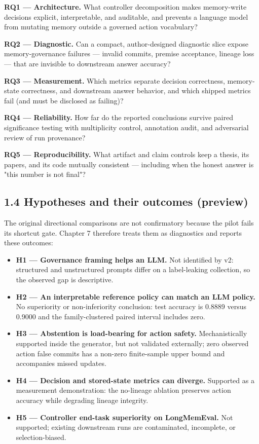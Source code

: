 \textbf{RQ1 --- Architecture.} What controller decomposition makes
memory-write decisions explicit, interpretable, and auditable, and
prevents a language model from mutating memory outside a governed action
vocabulary?

\textbf{RQ2 --- Diagnostic.} Can a compact, author-designed diagnostic
slice expose memory-governance failures --- invalid commits, premise
acceptance, lineage loss --- that are invisible to downstream answer
accuracy?

\textbf{RQ3 --- Measurement.} Which metrics separate decision
correctness, memory-state correctness, and downstream answer behavior,
and which shipped metrics fail (and must be disclosed as failing)?

\textbf{RQ4 --- Reliability.} How far do the reported conclusions
survive paired significance testing with multiplicity control,
annotation audit, and adversarial review of run provenance?

\textbf{RQ5 --- Reproducibility.} What artifact and claim controls keep
a thesis, its papers, and its code mutually consistent --- including
when the honest answer is "this number is not final"?

\subsection{1.4 Hypotheses and their outcomes
(preview)}\label{hypotheses-and-their-outcomes-preview}

The original directional comparisons are not confirmatory because the
pilot fails its shortcut gate. Chapter 7 therefore treats them as
diagnostics and reports these outcomes:

\begin{itemize}
\item
  \textbf{H1 --- Governance framing helps an LLM.} Not identified by v2:
  structured and unstructured prompts differ on a label-leaking
  collection, so the observed gap is descriptive.
\item
  \textbf{H2 --- An interpretable reference policy can match an LLM
  policy.} No superiority or non-inferiority conclusion: test accuracy
  is 0.8889 versus 0.9000 and the family-clustered paired interval
  includes zero.
\item
  \textbf{H3 --- Abstention is load-bearing for action safety.}
  Mechanistically supported inside the generator, but not validated
  externally; zero observed action false commits has a non-zero
  finite-sample upper bound and accompanies missed updates.
\item
  \textbf{H4 --- Decision and stored-state metrics can diverge.}
  Supported as a measurement demonstration: the no-lineage ablation
  preserves action accuracy while degrading lineage integrity.
\item
  \textbf{H5 --- Controller end-task superiority on LongMemEval.} Not
  supported; existing downstream runs are contaminated, incomplete, or
  selection-biased.
\end{itemize}

